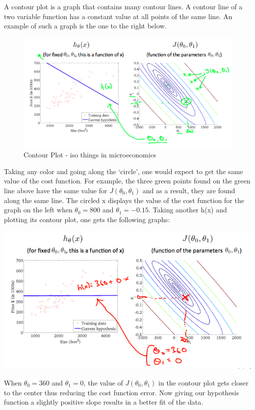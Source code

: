 \documentclass[
]{article}
\begin{document}
A contour plot is a graph that contains many contour lines. A contour
line of a two variable function has a constant value at all points of
the same line. An example of such a graph is the one to the right below.

\begin{figure}
\centering
\includegraphics{contour.png}
\caption{Contour Plot - iso things in microeconomics}
\end{figure}

Taking any color and going along the `circle', one would expect to get
the same value of the cost function. For example, the three green points
found on the green line above have the same value for
\(J(\theta_0,\theta_1)\) and as a result, they are found along the same
line. The circled x displays the value of the cost function for the
graph on the left when \(\theta_0 = 800\) and \(\theta_1 = -0.15\).
Taking another h(x) and plotting its contour plot, one gets the
following graphs:

\includegraphics{cost_function_intution2_graph2.png}

When \(\theta_0 = 360\) and \(\theta_1 = 0\), the value of
\(J(\theta_0,\theta_1)\) in the contour plot gets closer to the center
thus reducing the cost function error. Now giving our hypothesis
function a slightly positive slope results in a better fit of the data.
\end{document}
